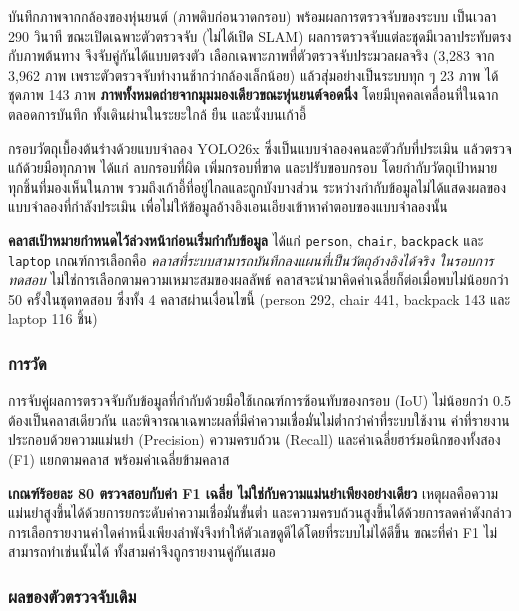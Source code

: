 \documentclass[a4paper,12pt]{report}
\begin{document}
บันทึกภาพจากกล้องของหุ่นยนต์ (ภาพดิบก่อนวาดกรอบ) พร้อมผลการตรวจจับของระบบ
เป็นเวลา 290 วินาที ขณะเปิดเฉพาะตัวตรวจจับ (ไม่ได้เปิด SLAM)
ผลการตรวจจับแต่ละชุดมีเวลาประทับตรงกับภาพต้นทาง จึงจับคู่กันได้แบบตรงตัว
เลือกเฉพาะภาพที่ตัวตรวจจับประมวลผลจริง (3,283 จาก 3,962 ภาพ
เพราะตัวตรวจจับทำงานช้ากว่ากล้องเล็กน้อย) แล้วสุ่มอย่างเป็นระบบทุก ๆ 23 ภาพ
ได้ชุดภาพ 143 ภาพ
\textbf{ภาพทั้งหมดถ่ายจากมุมมองเดียวขณะหุ่นยนต์จอดนิ่ง} โดยมีบุคคลเคลื่อนที่ในฉากตลอดการบันทึก
ทั้งเดินผ่านในระยะใกล้ ยืน และนั่งบนเก้าอี้

กรอบวัตถุเบื้องต้นร่างด้วยแบบจำลอง YOLO26x ซึ่งเป็นแบบจำลองคนละตัวกับที่ประเมิน
แล้วตรวจแก้ด้วยมือทุกภาพ ได้แก่ ลบกรอบที่ผิด เพิ่มกรอบที่ขาด และปรับขอบกรอบ
โดยกำกับวัตถุเป้าหมายทุกชิ้นที่มองเห็นในภาพ รวมถึงเก้าอี้ที่อยู่ไกลและถูกบังบางส่วน
ระหว่างกำกับข้อมูลไม่ได้แสดงผลของแบบจำลองที่กำลังประเมิน
เพื่อไม่ให้ข้อมูลอ้างอิงเอนเอียงเข้าหาคำตอบของแบบจำลองนั้น

\textbf{คลาสเป้าหมายกำหนดไว้ล่วงหน้าก่อนเริ่มกำกับข้อมูล} ได้แก่
\texttt{person}, \texttt{chair}, \texttt{backpack} และ \texttt{laptop}
เกณฑ์การเลือกคือ \emph{คลาสที่ระบบสามารถบันทึกลงแผนที่เป็นวัตถุอ้างอิงได้จริง
ในรอบการทดสอบ} ไม่ใช่การเลือกตามความเหมาะสมของผลลัพธ์
คลาสจะนำมาคิดค่าเฉลี่ยก็ต่อเมื่อพบไม่น้อยกว่า 50 ครั้งในชุดทดสอบ
ซึ่งทั้ง 4 คลาสผ่านเงื่อนไขนี้ (person 292, chair 441, backpack 143 และ laptop 116 ชิ้น)

\subsubsection{การวัด}

การจับคู่ผลการตรวจจับกับข้อมูลที่กำกับด้วยมือใช้เกณฑ์การซ้อนทับของกรอบ (IoU)
ไม่น้อยกว่า 0.5 ต้องเป็นคลาสเดียวกัน และพิจารณาเฉพาะผลที่มีค่าความเชื่อมั่นไม่ต่ำกว่าค่าที่ระบบใช้งาน
ค่าที่รายงานประกอบด้วยความแม่นยำ (Precision) ความครบถ้วน (Recall)
และค่าเฉลี่ยฮาร์มอนิกของทั้งสอง (F1) แยกตามคลาส พร้อมค่าเฉลี่ยข้ามคลาส

\textbf{เกณฑ์ร้อยละ 80 ตรวจสอบกับค่า F1 เฉลี่ย ไม่ใช่กับความแม่นยำเพียงอย่างเดียว}
เหตุผลคือความแม่นยำสูงขึ้นได้ด้วยการยกระดับค่าความเชื่อมั่นขั้นต่ำ
และความครบถ้วนสูงขึ้นได้ด้วยการลดค่าดังกล่าว
การเลือกรายงานค่าใดค่าหนึ่งเพียงลำพังจึงทำให้ตัวเลขดูดีได้โดยที่ระบบไม่ได้ดีขึ้น
ขณะที่ค่า F1 ไม่สามารถทำเช่นนั้นได้ ทั้งสามค่าจึงถูกรายงานคู่กันเสมอ

\subsubsection{ผลของตัวตรวจจับเดิม}
\end{document}
